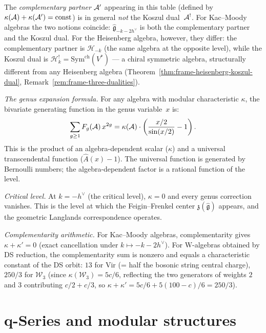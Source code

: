 \begin{remark}\label{rem:complementary-vs-koszul-dual}
The \emph{complementary partner} $\mathcal{A}'$ appearing in this table
(defined by $\kappa(\mathcal{A}) + \kappa(\mathcal{A}') = \text{const}$) is in
general \emph{not} the Koszul dual~$\mathcal{A}^!$.
For Kac--Moody algebras the two notions coincide:
$\widehat{\mathfrak{g}}_{-k-2h^\vee}$ is both the complementary
partner and the Koszul dual.  For the Heisenberg algebra, however,
they differ: the complementary partner is $\mathcal{H}_{-k}$
(the same algebra at the opposite level), while the Koszul dual is
$\mathcal{H}_k^! = \mathrm{Sym}^{\mathrm{ch}}(V^*)$ --- a chiral
symmetric algebra, structurally different from any Heisenberg algebra
(Theorem~\ref{thm:frame-heisenberg-koszul-dual},
Remark~\ref{rem:frame-three-dualities}).
\end{remark}

\emph{The genus expansion formula.}
For any algebra with modular characteristic $\kappa$, the bivariate generating function in the genus variable~$x$ is:
\[
\sum_{g \geq 1} F_g(\mathcal{A})\, x^{2g}
= \kappa(\mathcal{A}) \cdot \left(\frac{x/2}{\sin(x/2)} - 1\right).
\]
This is the product of an algebra-dependent scalar ($\kappa$) and a universal transcendental function ($\hat{A}(x) - 1$).  The universal function is generated by Bernoulli numbers; the algebra-dependent factor is a rational function of the level.

\emph{Critical level.}
At $k = -h^\vee$ (the critical level), $\kappa = 0$ and every genus correction vanishes.  This is the level at which the Feigin--Frenkel center $\mathfrak{z}(\widehat{\mathfrak{g}})$ appears, and the geometric Langlands correspondence operates.

\emph{Complementarity arithmetic.}
For Kac--Moody algebras, complementarity gives $\kappa + \kappa' = 0$ (exact cancellation under $k \mapsto -k - 2h^\vee$).  For W-algebras obtained by DS reduction, the complementarity sum is nonzero and equals a characteristic constant of the DS orbit: $13$ for $\mathrm{Vir}$ (= half the bosonic string central charge), $250/3$ for $\mathcal{W}_3$ (since $\kappa(\mathcal{W}_3) = 5c/6$, reflecting the two generators of weights $2$ and $3$ contributing $c/2 + c/3$, so $\kappa + \kappa' = 5c/6 + 5(100-c)/6 = 250/3$).


\section{q-Series and modular structures}
\label{sec:q-series}

